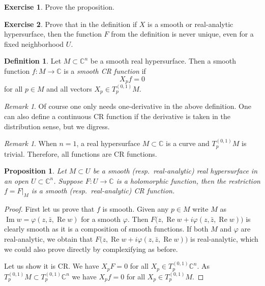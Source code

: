 \documentclass[12pt,openany]{book}
\renewcommand{\Re}{\operatorname{Re}}
\renewcommand{\Im}{\operatorname{Im}}
\newcommand{\C}{{\mathbb{C}}}
\newcommand{\myindex}[1]{#1\index{#1}}
\theoremstyle{plain}
\newtheorem{prop}[thm]{Proposition}
\theoremstyle{remark}
\newtheorem{remark}[thm]{Remark}
\theoremstyle{definition}
\newtheorem{defn}[thm]{Definition}
\newenvironment{exbox}{%
    \def\FrameCommand{\vrule width 1pt \relax\hspace {10pt}}%
    \MakeFramed {\advance \hsize -\width \FrameRestore }%
}{%
    \endMakeFramed
}
\theoremstyle{exercise}
\newtheorem{exercise}{Exercise}[section]
\theoremstyle{example}
\begin{document}
\begin{exbox}
\begin{exercise}
Prove the proposition.
\end{exercise}

\begin{exercise}
Prove that in the definition if $X$ is a smooth or real-analytic
hypersurface, then the function $F$ from the definition is never unique,
even for a fixed neighborhood $U$.
\end{exercise}
\end{exbox}

\begin{defn}
Let $M \subset \C^n$ be a smooth real hypersurface.  Then
a smooth function $f \colon M \to \C$ is a
\emph{\myindex{smooth CR function}} if
\begin{equation*}
X_p f = 0
\end{equation*}
for all $p \in M$ and all vectors $X_p \in T^{(0,1)}_p M$.
\end{defn}

\begin{remark}
Of course one only needs one-derivative in the above definition.  One can also
define a continuous CR function if the derivative is taken in the
distribution sense, but we digress.
\end{remark}

\begin{remark}
When $n=1$, a real hypersurface $M \subset \C$ is a curve and $T^{(0,1)}_p M$
is trivial.  Therefore, all functions are CR functions.
\end{remark}

\begin{prop}
Let $M \subset U$ be a smooth (resp.\ real-analytic) real hypersurface in an
open $U
\subset \C^n$.  Suppose $F \colon U \to \C$ is a holomorphic function,
then the restriction $f = F|_M$ is a smooth (resp.\ real-analytic) CR function.
\end{prop}

\begin{proof}
First let us prove that $f$ is smooth.  Given any $p \in M$ write $M$
as $\Im w = \varphi(z,\bar{z},\Re w)$ for a smooth $\varphi$.
Then $F\bigl(z,\Re w + i \varphi(z,\bar{z},\Re w) \bigr)$
is clearly smooth as it is a composition of smooth functions.
If both $M$ and $\varphi$ are real-analytic, we obtain that 
$F\bigl(z,\Re w + i \varphi(z,\bar{z},\Re w) \bigr)$ is real-analytic, which
we could also prove directly by complexifying as before.

Let us show it is CR\@.
We have $X_p F = 0$
for all $X_p \in T_p^{(0,1)} \C^n$.
As $T_p^{(0,1)} M \subset T_p^{(0,1)} \C^n$ we have
$X_p f = 0$ for all $X_p \in T_p^{(0,1)} M$.
\end{proof}
\end{document}
